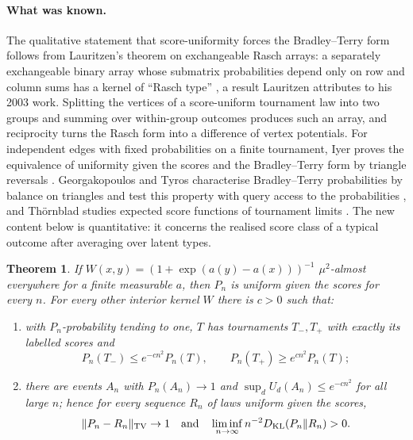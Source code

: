 \documentclass[11pt,a4paper]{article}
\newtheorem{theorem}{Theorem}[section]
\theoremstyle{definition}
\begin{document}
\paragraph{What was known.} The qualitative statement that score-uniformity forces the Bradley--Terry form follows from Lauritzen's theorem on exchangeable Rasch arrays: a separately exchangeable binary array whose submatrix probabilities depend only on row and column sums has a kernel of ``Rasch type'' \cite[Section~2.4, eq.~(2)]{Lauritzen2008}, a result Lauritzen attributes to his 2003 work. Splitting the vertices of a score-uniform tournament law into two groups and summing over within-group outcomes produces such an array, and reciprocity turns the Rasch form into a difference of vertex potentials. For independent edges with fixed probabilities on a finite tournament, Iyer proves the equivalence of uniformity given the scores and the Bradley--Terry form by triangle reversals \cite[Theorem~4.2.9]{Iyer2016}. Georgakopoulos and Tyros characterise Bradley--Terry probabilities by balance on triangles and test this property with query access to the probabilities \cite{GT2016}, and Th\"ornblad studies expected score functions of tournament limits \cite{Thornblad2016}. The new content below is quantitative: it concerns the realised score class of a typical outcome after averaging over latent types.

\begin{theorem}\label{thm:general-kernels}
If $W(x,y)=(1+\exp(a(y)-a(x)))^{-1}$ $\mu^2$-almost everywhere for a finite measurable $a$, then $P_n$ is uniform given the scores for every $n$. For every other interior kernel $W$ there is $c>0$ such that:
\begin{enumerate}
\item with $P_n$-probability tending to one, $T$ has tournaments $T_-,T_+$ with exactly its labelled scores and
\[
 P_n(T_-)\le e^{-cn^2}P_n(T),\qquad P_n(T_+)\ge e^{cn^2}P_n(T);
\]
\item there are events $A_n$ with $P_n(A_n)\to1$ and $\sup_d U_d(A_n)\le e^{-cn^2}$ for all large $n$; hence for every sequence $R_n$ of laws uniform given the scores,
\[
 \|P_n-R_n\|_{\rm TV}\to1\quad\text{and}\quad\liminf_{n\to\infty} n^{-2}D_{\rm KL}(P_n\Vert R_n)>0.
\]
\end{enumerate}
\end{theorem}
\end{document}
